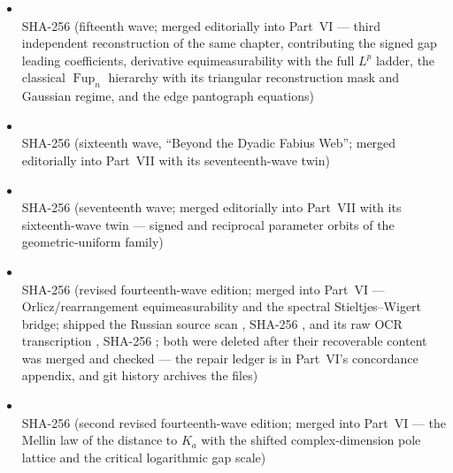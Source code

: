 \documentclass[11pt,oneside]{article}
\numberwithin{equation}{section}
\theoremstyle{definition}
\theoremstyle{remark}
\begin{document}
\begin{itemize}
\item {} \\ {\footnotesize SHA-256 } (fifteenth wave; merged editorially into Part~VI --- third independent reconstruction of the same chapter, contributing the signed gap leading coefficients, derivative equimeasurability with the full $L^p$ ladder, the classical $\operatorname{Fup}_n$ hierarchy with its triangular reconstruction mask and Gaussian regime, and the edge pantograph equations)
\item {} \\ {\footnotesize SHA-256 } (sixteenth wave, ``Beyond the Dyadic Fabius Web''; merged editorially into Part~VII with its seventeenth-wave twin)
\item {} \\ {\footnotesize SHA-256 } (seventeenth wave; merged editorially into Part~VII with its sixteenth-wave twin --- signed and reciprocal parameter orbits of the geometric-uniform family)
\item {} \\ {\footnotesize SHA-256 } (revised fourteenth-wave edition; merged into Part~VI --- Orlicz/rearrangement equimeasurability and the spectral Stieltjes--Wigert bridge; shipped the Russian source scan , SHA-256 , and its raw OCR transcription , SHA-256 ; both were deleted after their recoverable content was merged and checked --- the repair ledger is in Part~VI's concordance appendix, and git history archives the files)
\item {} \\ {\footnotesize SHA-256 } (second revised fourteenth-wave edition; merged into Part~VI --- the Mellin law of the distance to $K_a$ with the shifted complex-dimension pole lattice and the critical logarithmic gap scale)

\end{itemize}
\end{document}
